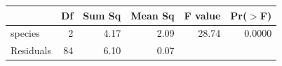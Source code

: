 \begin{table}[ht]
\centering
\begin{tabular}{lrrrrr}
  \hline
 & Df & Sum Sq & Mean Sq & F value & Pr($>$F) \\ 
  \hline
species & 2 & 4.17 & 2.09 & 28.74 & 0.0000 \\ 
  Residuals & 84 & 6.10 & 0.07 &  &  \\ 
   \hline
\end{tabular}
\end{table}
